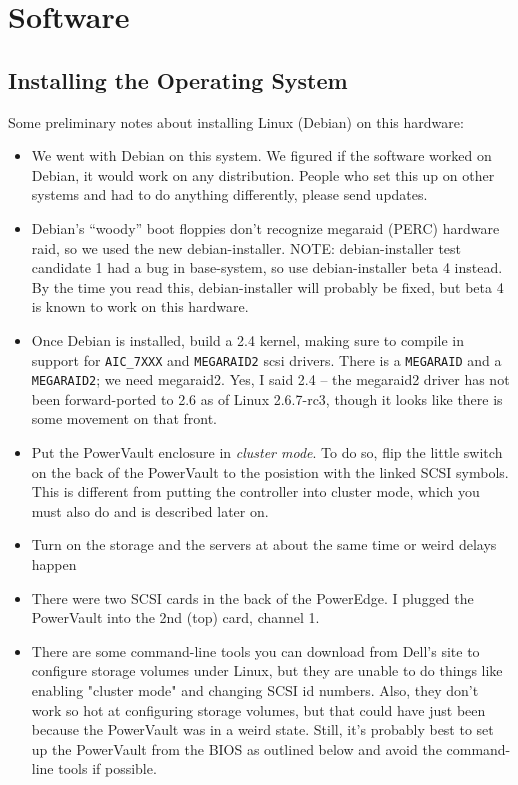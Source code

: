 \documentclass[11pt]{article}
\begin{document}
\section{Software}
\subsection{Installing the Operating System}
Some preliminary notes about installing Linux (Debian) on this hardware:

\begin{itemize}
\item We went with Debian on this system.  We figured if the software worked
  on Debian, it would work on any distribution.  People who set this up
  on other systems and had to do anything differently, please send
  updates.

\item Debian's ``woody'' boot floppies don't recognize megaraid (PERC)
  hardware raid, so we used the new debian-installer.  NOTE:
  debian-installer test candidate 1 had a bug in base-system, so use
  debian-installer beta 4 instead.  By the time you read this,
  debian-installer will probably be fixed, but beta 4 is known to work
  on this hardware.

\item Once Debian is installed, build a 2.4 kernel, making sure to compile
  in support for \texttt{AIC\_7XXX} and \texttt{MEGARAID2} scsi drivers.
  There is a \texttt{MEGARAID} and a \texttt{MEGARAID2}; we need
  megaraid2.  Yes, I said 2.4 -- the megaraid2 driver has not been
  forward-ported to 2.6 as of Linux 2.6.7-rc3, though it looks like
  there is some movement on that front. 

\item Put the PowerVault enclosure in \emph{cluster mode}.  To do so,
  flip the little switch on the back of the PowerVault to the posistion
  with the linked SCSI symbols.  This is different from putting the
  controller into cluster mode, which you must also do and is described
  later on.

\item Turn on the storage and the servers at about the same time or
  weird delays happen

\item There were two SCSI cards in the back of the PowerEdge. I plugged the
  PowerVault into the 2nd (top) card, channel 1.

\item There are some command-line tools you can download from Dell's
  site to configure storage volumes under Linux, but they are unable to
  do things like enabling "cluster mode" and changing SCSI id numbers.
  Also, they don't work so hot at configuring storage volumes, but that
  could have just been because the PowerVault was in a weird state.
  Still, it's probably best to set up the PowerVault from the BIOS as
  outlined below and avoid the command-line tools if possible.


\end{itemize}
\end{document}

